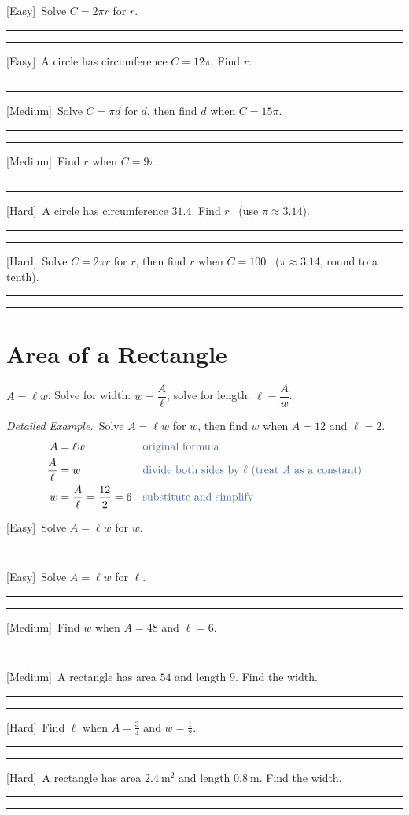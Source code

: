 \documentclass[11pt]{article}
\newcommand{\E}{\textcolor{levE}{\small[Easy]}\ }
\newcommand{\M}{\textcolor{levM}{\small[Medium]}\ }
\newcommand{\Hd}{\textcolor{levH}{\small[Hard]}\ }
\newcommand{\example}{\textit{\textcolor{fangblue}{Detailed Example.}}\ }
\newcommand{\twolines}{\par\vspace{0.7cm}%
  \textcolor{gray!55}{\rule{\linewidth}{0.3pt}}\par\vspace{0.7cm}%
  \textcolor{gray!55}{\rule{\linewidth}{0.3pt}}\par\vspace{2mm}}
\begin{document}
\begin{prob}
\item \E Solve $C = 2\pi r$ for $r$. \twolines
\item \E A circle has circumference $C = 12\pi$. Find $r$. \twolines
\item \M Solve $C = \pi d$ for $d$, then find $d$ when $C = 15\pi$. \twolines
\item \M Find $r$ when $C = 9\pi$. \twolines
\item \Hd A circle has circumference $31.4$. Find $r$ \ (use $\pi \approx 3.14$). \twolines
\item \Hd Solve $C = 2\pi r$ for $r$, then find $r$ when $C = 100$ \ ($\pi \approx 3.14$, round to a tenth). \twolines
\end{prob}

\section{Area of a Rectangle}
\begin{keybox}
$A = \ell w$. \quad Solve for width: $w = \dfrac{A}{\ell}$; \quad solve for length: $\ell = \dfrac{A}{w}$.
\end{keybox}

\example Solve $A = \ell w$ for $w$, then find $w$ when $A = 12$ and $\ell = 2$.
\begin{align*}
A &= \ell w &&\color{reasonclr}\text{original formula}\\
\frac{A}{\ell} &= w &&\color{reasonclr}\text{divide both sides by } \ell\ (\text{treat } A \text{ as a constant})\\
w &= \frac{A}{\ell} = \frac{12}{2} = 6 &&\color{reasonclr}\text{substitute and simplify}
\end{align*}

\begin{prob}
\item \E Solve $A = \ell w$ for $w$. \twolines
\item \E Solve $A = \ell w$ for $\ell$. \twolines
\item \M Find $w$ when $A = 48$ and $\ell = 6$. \twolines
\item \M A rectangle has area $54$ and length $9$. Find the width. \twolines
\item \Hd Find $\ell$ when $A = \tfrac34$ and $w = \tfrac12$. \twolines
\item \Hd A rectangle has area $2.4\ \text{m}^2$ and length $0.8\ \text{m}$. Find the width. \twolines
\end{prob}
\end{document}
